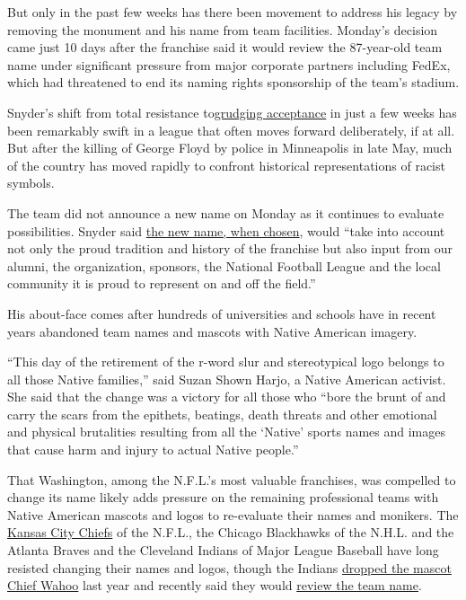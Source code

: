 But only in the past few weeks has there been movement to address his
legacy by removing the monument and his name from team facilities.
Monday's decision came just 10 days after the franchise said it would
review the 87-year-old team name under significant pressure from major
corporate partners including FedEx, which had threatened to end its
naming rights sponsorship of the team's stadium.

Snyder's shift from total resistance
to\href{https://www.nytimes3xbfgragh.onion/2020/06/24/sports/football/redskins-ring-of-fame-marshall.html}{grudging
acceptance} in just a few weeks has been remarkably swift in a league
that often moves forward deliberately, if at all. But after the killing
of George Floyd by police in Minneapolis in late May, much of the
country has moved rapidly to confront historical representations of
racist symbols.

The team did not announce a new name on Monday as it continues to
evaluate possibilities. Snyder said
\href{https://www.nfl.com/news/washington-redskins-to-undergo-thorough-review-of-team-s-name}{the
new name, when chosen}, would ``take into account not only the proud
tradition and history of the franchise but also input from our alumni,
the organization, sponsors, the National Football League and the local
community it is proud to represent on and off the field.''

His about-face comes after hundreds of universities and schools have in
recent years abandoned team names and mascots with Native American
imagery.

``This day of the retirement of the r-word slur and stereotypical logo
belongs to all those Native families,'' said Suzan Shown Harjo, a Native
American activist. She said that the change was a victory for all those
who ``bore the brunt of and carry the scars from the epithets, beatings,
death threats and other emotional and physical brutalities resulting
from all the `Native' sports names and images that cause harm and injury
to actual Native people.''

That Washington, among the N.F.L.'s most valuable franchises, was
compelled to change its name likely adds pressure on the remaining
professional teams with Native American mascots and logos to re-evaluate
their names and monikers. The
\href{https://www.nytimes3xbfgragh.onion/2020/01/29/sports/football/chiefs-tomahawk-chop.html}{Kansas
City Chiefs} of the N.F.L., the Chicago Blackhawks of the N.H.L. and the
Atlanta Braves and the Cleveland Indians of Major League Baseball have
long resisted changing their names and logos, though the Indians
\href{https://www.nytimes3xbfgragh.onion/2018/01/29/sports/baseball/cleveland-indians-chief-wahoo-logo.html}{dropped
the mascot Chief Wahoo} last year and recently said they would
\href{https://www.nytimes3xbfgragh.onion/2020/07/03/sports/baseball/cleveland-indians-name-change.html}{review
the team name}.


